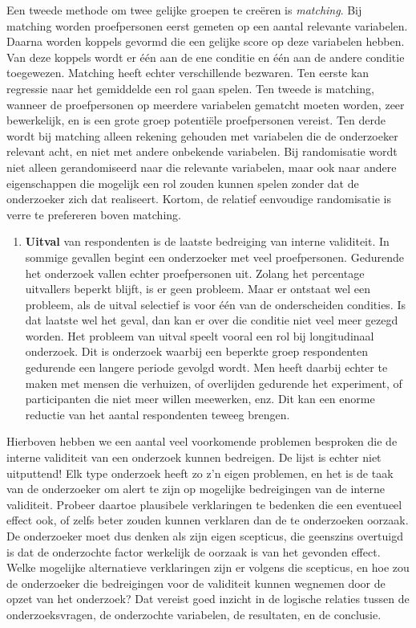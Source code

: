 \documentclass[
]{book}
\providecommand{\tightlist}{%
  \setlength{\itemsep}{0pt}\setlength{\parskip}{0pt}}
\begin{document}
Een tweede methode om twee gelijke groepen te creëren is \emph{matching}. Bij
matching worden proefpersonen eerst gemeten op een aantal relevante
variabelen. Daarna worden koppels gevormd die een gelijke score op deze
variabelen hebben. Van deze koppels wordt er één aan de ene conditie en
één aan de andere conditie toegewezen. Matching heeft echter
verschillende bezwaren. Ten eerste kan regressie naar het gemiddelde een
rol gaan spelen. Ten tweede is matching, wanneer de proefpersonen op
meerdere variabelen gematcht moeten worden, zeer bewerkelijk, en is een
grote groep potentiële proefpersonen vereist. Ten derde wordt bij
matching alleen rekening gehouden met variabelen die de onderzoeker
relevant acht, en niet met andere onbekende variabelen. Bij randomisatie
wordt niet alleen gerandomiseerd naar die relevante variabelen, maar ook
naar andere eigenschappen die mogelijk een rol zouden kunnen spelen
zonder dat de onderzoeker zich dat realiseert. Kortom, de relatief
eenvoudige randomisatie is verre te prefereren boven matching.

\begin{enumerate}
\def\labelenumi{\arabic{enumi}.}
\setcounter{enumi}{5}
\tightlist
\item
  \textbf{Uitval} van respondenten is de laatste bedreiging van interne
  validiteit. In sommige gevallen begint een onderzoeker met veel
  proefpersonen. Gedurende het onderzoek vallen echter proefpersonen uit.
  Zolang het percentage uitvallers beperkt blijft, is er geen probleem.
  Maar er ontstaat wel een probleem, als de uitval selectief is voor één
  van de onderscheiden condities. Is dat laatste wel het geval, dan kan er
  over die conditie niet veel meer gezegd worden. Het probleem van uitval
  speelt vooral een rol bij longitudinaal onderzoek. Dit is onderzoek
  waarbij een beperkte groep respondenten gedurende een langere periode
  gevolgd wordt. Men heeft daarbij echter te maken met mensen die
  verhuizen, of overlijden gedurende het experiment, of participanten die
  niet meer willen meewerken, enz. Dit kan een enorme reductie van het
  aantal respondenten teweeg brengen.
\end{enumerate}

Hierboven hebben we een aantal veel voorkomende problemen besproken die
de interne validiteit van een onderzoek kunnen bedreigen. De lijst is
echter niet uitputtend! Elk type onderzoek heeft zo z'n eigen problemen,
en het is de taak van de onderzoeker om alert te zijn op mogelijke
bedreigingen van de interne validiteit. Probeer daartoe plausibele
verklaringen te bedenken die een eventueel effect ook, of zelfs beter
zouden kunnen verklaren dan de te onderzoeken oorzaak. De onderzoeker
moet dus denken als zijn eigen scepticus, die geenszins overtuigd is dat
de onderzochte factor werkelijk de oorzaak is van het gevonden effect.
Welke mogelijke alternatieve verklaringen zijn er volgens die scepticus,
en hoe zou de onderzoeker die bedreigingen voor de validiteit kunnen
wegnemen door de opzet van het onderzoek? Dat vereist goed inzicht in de
logische relaties tussen de onderzoeksvragen, de onderzochte variabelen,
de resultaten, en de conclusie.
\end{document}
